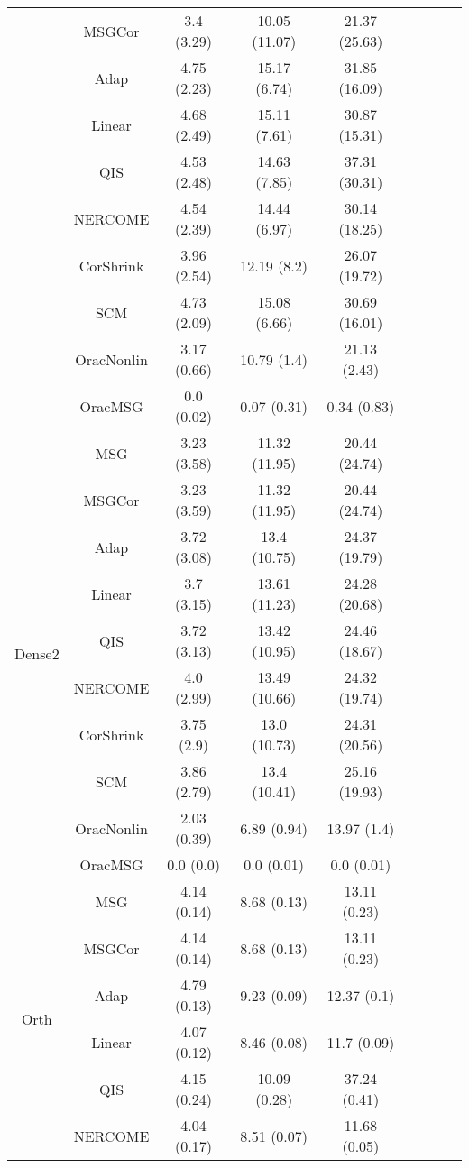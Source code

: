 \documentclass[useAMS,referee,usenatbib]{biom}
\begin{document}
\begin{table}[H]
{\begin{tabular}{ccccccccc}
 & MSGCor   & 3.4 (3.29)  & 10.05 (11.07) & 21.37 (25.63) \\
 & Adap     & 4.75 (2.23) & 15.17 (6.74)  & 31.85 (16.09) \\
 & Linear         & 4.68 (2.49) & 15.11 (7.61)  & 30.87 (15.31) \\
 & QIS            & 4.53 (2.48) & 14.63 (7.85)  & 37.31 (30.31) \\
 & NERCOME        & 4.54 (2.39) & 14.44 (6.97)  & 30.14 (18.25) \\
 & CorShrink      & 3.96 (2.54) & 12.19 (8.2)   & 26.07 (19.72) \\
 & SCM            & 4.73 (2.09) & 15.08 (6.66)  & 30.69 (16.01) \\
 & OracNonlin & 3.17 (0.66) & 10.79 (1.4)   & 21.13 (2.43)  \\
 & OracMSG  & 0.0 (0.02)  & 0.07 (0.31)   & 0.34 (0.83)   \\ \midrule
\multirow{10}{*}{Dense2}  
 & MSG & 3.23 (3.58) & 11.32 (11.95) & 20.44 (24.74) \\
 & MSGCor   & 3.23 (3.59) & 11.32 (11.95) & 20.44 (24.74) \\
 & Adap     & 3.72 (3.08) & 13.4 (10.75)  & 24.37 (19.79) \\
 & Linear         & 3.7 (3.15)  & 13.61 (11.23) & 24.28 (20.68) \\
 & QIS            & 3.72 (3.13) & 13.42 (10.95) & 24.46 (18.67) \\
 & NERCOME        & 4.0 (2.99)  & 13.49 (10.66) & 24.32 (19.74) \\
 & CorShrink      & 3.75 (2.9)  & 13.0 (10.73)  & 24.31 (20.56) \\
 & SCM            & 3.86 (2.79) & 13.4 (10.41)  & 25.16 (19.93) \\
 & OracNonlin & 2.03 (0.39) & 6.89 (0.94)   & 13.97 (1.4)   \\
 & OracMSG  & 0.0 (0.0)   & 0.0 (0.01)    & 0.0 (0.01)   \\ \midrule
\multirow{10}{*}{Orth}  
 & MSG & 4.14 (0.14) & 8.68 (0.13)  & 13.11 (0.23) \\
 & MSGCor   & 4.14 (0.14) & 8.68 (0.13)  & 13.11 (0.23) \\
 & Adap     & 4.79 (0.13) & 9.23 (0.09)  & 12.37 (0.1)  \\
 & Linear         & 4.07 (0.12) & 8.46 (0.08)  & 11.7 (0.09)  \\
 & QIS            & 4.15 (0.24) & 10.09 (0.28) & 37.24 (0.41) \\
 & NERCOME        & 4.04 (0.17) & 8.51 (0.07)  & 11.68 (0.05) \\

\end{tabular}}
\end{table}
\end{document}

